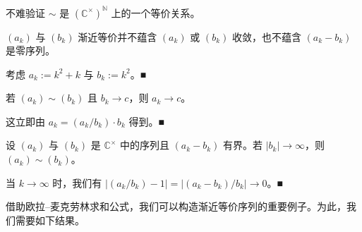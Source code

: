 \begin{remark}

\begin{items}
\item

不难验证 $ \sim $ 是 $ (\mathbb{C}^\times)^{\mathbb{N}} $ 上的一个等价关系。

\item

$ (a_k) $ 与 $ (b_k) $ 渐近等价并不蕴含 $ (a_k) $ 或 $ (b_k) $ 收敛，也不蕴含 $ (a_k - b_k) $ 是零序列。

\proofhead
考虑 $ a_k := k^2 + k $ 与 $ b_k := k^2 $。\nobreak\hspace{0.35em}■
\item

若 $ (a_k) \sim (b_k) $ 且 $ b_k \to c $，则 $ a_k \to c $。

\proofhead
这立即由 $ a_k = (a_k/b_k)\cdot b_k $ 得到。\nobreak\hspace{0.35em}■
\item

设 $ (a_k) $ 与 $ (b_k) $ 是 $ \mathbb{C}^\times $ 中的序列且 $ (a_k - b_k) $ 有界。若 $ |b_k| \to \infty $，则 $ (a_k) \sim (b_k) $。

\proofhead
当 $ k \to \infty $ 时，我们有 $ |(a_k/b_k) - 1| = |(a_k - b_k)/b_k| \to 0 $。\nobreak\hspace{0.35em}■
\end{items}

\end{remark}

借助欧拉–麦克劳林求和公式，我们可以构造渐近等价序列的重要例子。为此，我们需要如下结果。


